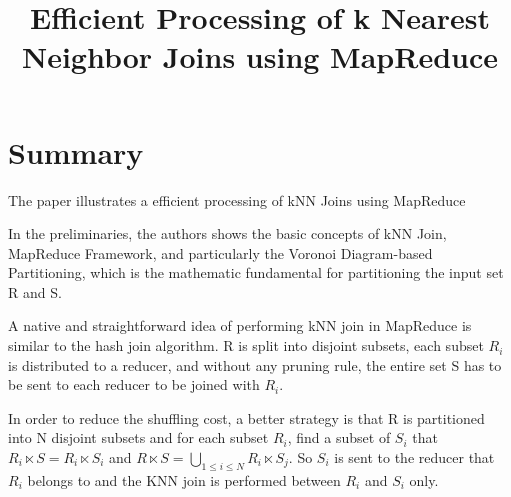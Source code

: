 \documentclass[conference]{IEEEtran}
\begin{document}
	
	\title{Efficient Processing of k Nearest Neighbor Joins using
		MapReduce}
	

	
	
	\maketitle
	

	
	\IEEEpeerreviewmaketitle
	
	
	\section{Summary}
	The paper illustrates a efficient processing of kNN Joins using MapReduce
	
	In the preliminaries, the authors shows the basic concepts of kNN Join,  MapReduce Framework, and particularly the Voronoi Diagram-based Partitioning, which is the mathematic fundamental for partitioning the input set R and S.
	
	A native and straightforward idea of performing kNN join in MapReduce is similar to the hash join algorithm. R is split into disjoint subsets, each subset $R_i$ is distributed to a reducer, and without any pruning rule, the entire set S has to be sent to each reducer to be joined with $ R_i $. 
	
	In order to reduce the shuffling cost, a better strategy is that R is partitioned into N disjoint subsets and for each subset $ R_i $, find a subset of $ S_i $ that $ R_i \ltimes S = R_i \ltimes S_i$ and $ R \ltimes S=\bigcup_{1\leq i \leq N } R_i \ltimes S_j$. So $ S_i $ is sent to the reducer that $ R_i $ belongs to and the KNN join is performed between $ R_i $ and $ S_i $ only. 
	
\end{document}
